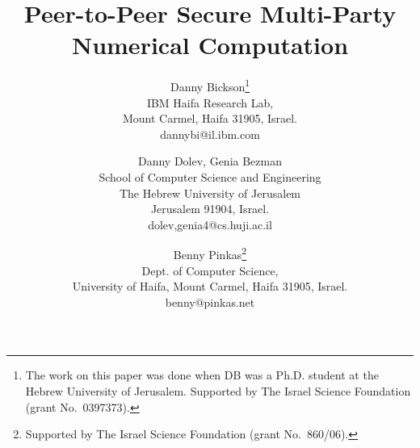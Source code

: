 \documentclass[times, 10pt,twocolumn]{article}
\begin{document}
\newcommand{\ignore}[1]{}
\newcommand{\db}[1]{{\sffamily\bfseries\Large \mbox{***DB:\ } #1 \mbox{****
}}}
\newcommand{\sk}[1]{{\sffamily\bfseries\Large \mbox{***SK:\ } #1 \mbox{****
}}}
\newcommand{\comment}[1]  {}
\newcommand\ie{{\textsl{i.e.\,}}}
\newcommand\eg{{\textsl{e.g.\,}}}
\newcommand\etal{{\textsl{et al.\,}}}
\def\BE{}
\def\BEA{}
\newcommand{\cut}[1]{{}}
\newcommand\va{{\bf a}} \newcommand\vb{{\bf b}}
\newcommand\vc{{\bf c}}
\newcommand\vd{{\bf d}}
\newcommand\ve{{\bf e}}
\newcommand\vf{{\bf f}}
\newcommand\vg{{\bf g}}
\newcommand\vh{{\bf h}}
\newcommand\vi{{\bf i}}
\newcommand\vj{{\bf j}}
\newcommand\vk{{\bf k}}
\newcommand\vl{{\bf l}}
\newcommand\vm{{\bf m}}
\newcommand\vn{{\bf n}}
\newcommand\vo{{\bf o}}
\newcommand\vp{{\bf p}}
\newcommand\vq{{\bf q}}
\newcommand\vr{{\bf r}}
\newcommand\vs{{\bf s}}
\newcommand\vt{{\bf t}}
\newcommand\vu{{\bf u}}
\newcommand\vv{{\bf v}}
\newcommand\vw{{\bf w}}
\newcommand\vx{{\bf x}}
\newcommand\vy{{\bf y}}
\newcommand\vz{{\bf z}}
\newcommand\mA{{\bf A}} \newcommand\mB{{\bf B}}
\newcommand\mC{{\bf C}}
\newcommand\mD{{\bf D}}
\newcommand\mE{{\bf E}}
\newcommand\mF{{\bf F}}
\newcommand\mG{{\bf G}}
\newcommand\mH{{\bf H}}
\newcommand\mI{{\bf I}}
\newcommand\mJ{{\bf J}}
\newcommand\mK{{\bf K}}
\newcommand\mL{{\bf L}}
\newcommand\mM{{\bf M}}
\newcommand\mN{{\bf N}}
\newcommand\mO{{\bf O}}
\newcommand\mP{{\bf P}}
\newcommand\mQ{{\bf Q}}
\newcommand\mR{{\bf R}}
\newcommand\mS{{\bf S}}
\newcommand\mT{{\bf T}}
\newcommand\mU{{\bf U}}
\newcommand\mV{{\bf V}}
\newcommand\mW{{\bf W}}
\newcommand\mX{{\bf X}}
\newcommand\mY{{\bf Y}}
\newcommand\mZ{{\bf Z}}



\title{Peer-to-Peer Secure Multi-Party Numerical Computation}
\author{Danny Bickson\thanks{The work on this paper was done when DB was a Ph.D. student at the Hebrew University of Jerusalem. Supported by The Israel Science Foundation
  (grant No.~0397373).}\\
IBM Haifa Research Lab,\\Mount Carmel, Haifa 31905, Israel.\\ dannybi@il.ibm.com\\
\and Danny Dolev, Genia Bezman\\
School of Computer Science and Engineering\\
The Hebrew University of Jerusalem\\
Jerusalem 91904, Israel.\\
dolev,genia4@cs.huji.ac.il\\
\and Benny Pinkas\thanks{Supported by The Israel Science Foundation
  (grant No.~860/06).}\\
Dept. of Computer Science,\\ University of Haifa, Mount Carmel, Haifa 31905, Israel.\\
benny@pinkas.net\\
}
\end{document}
